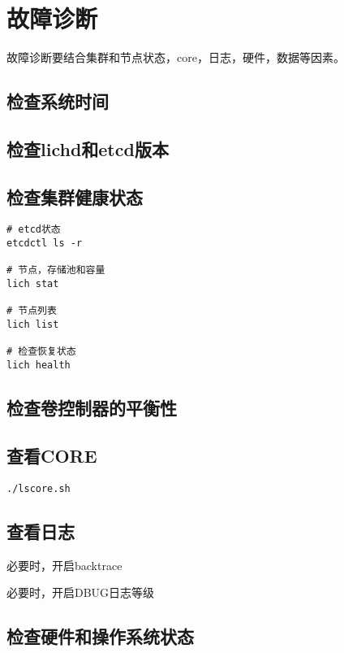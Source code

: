 \section{故障诊断}

故障诊断要结合集群和节点状态，core，日志，硬件，数据等因素。

\subsection{检查系统时间}

\subsection{检查lichd和etcd版本}

\subsection{检查集群健康状态}

\begin{lstlisting}
# etcd状态
etcdctl ls -r

# 节点，存储池和容量
lich stat

# 节点列表
lich list

# 检查恢复状态
lich health
\end{lstlisting}

\subsection{检查卷控制器的平衡性}

\subsection{查看CORE}

\begin{lstlisting}
./lscore.sh
\end{lstlisting}

\subsection{查看日志}

必要时，开启backtrace

必要时，开启DBUG日志等级

\subsection{检查硬件和操作系统状态}

